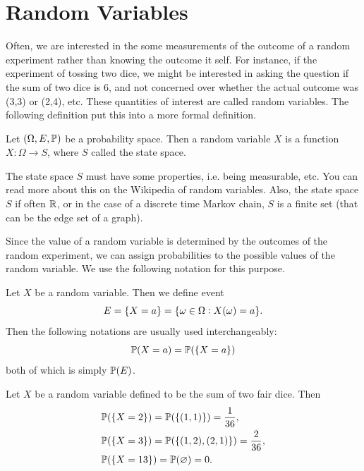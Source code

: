 \section{Random Variables}
Often, we are interested in the some measurements of the outcome of a random experiment rather than knowing the outcome it self. For instance, if the experiment of tossing two dice, we might be interested in asking the question if the sum of two dice is 6, and not concerned over whether the actual outcome was (3,3) or (2,4), etc. These quantities of interest are called random variables. The following definition put this into a more formal definition.

\begin{definition}
	Let $(\Omega, E, \mathbb{P})$ be a probability space. Then a random variable $X$ is a function $X: \Omega \to S$, where $S$ called the state space.
\end{definition}

\begin{remark}
	The state space $S$ must have some properties, i.e. being measurable, etc. You can read more about this on the Wikipedia of random variables. Also, the state space $S$ if often $\mathbb{R}$, or in the case of a discrete time Markov chain, $S$ is a finite set (that can be the edge set of a graph).
\end{remark}

Since the value of a random variable is determined by the outcomes of the random experiment, we can assign probabilities to the possible values of the random variable. We use the following notation for this purpose.

\begin{definition}
	Let $X$ be a random variable. Then we define event 
	\[ E = \{X = a\} = \{\omega \in \Omega: X(\omega) = a\}. \]
	Then the following notations are usually used interchangeably:
	\[ \mathbb{P}(X=a) = \mathbb{P}(\{X=a\})  \]
	both of which is simply $\mathbb{P}(E)$.
\end{definition}

\begin{example}
	Let $X$ be a random variable defined to be the sum of two fair dice. Then 
	\begin{align*}
		&\mathbb{P}(\{X =2\}) = \mathbb{P}(\{(1,1)\}) = \frac{1}{36},\\
		&\mathbb{P}(\{X=3\}) = \mathbb{P}(\{(1,2),(2,1)\}) = \frac{2}{36},\\
		&\mathbb{P}(\{X=13\}) = \mathbb{P}(\varnothing) = 0.
	\end{align*}
\end{example}

